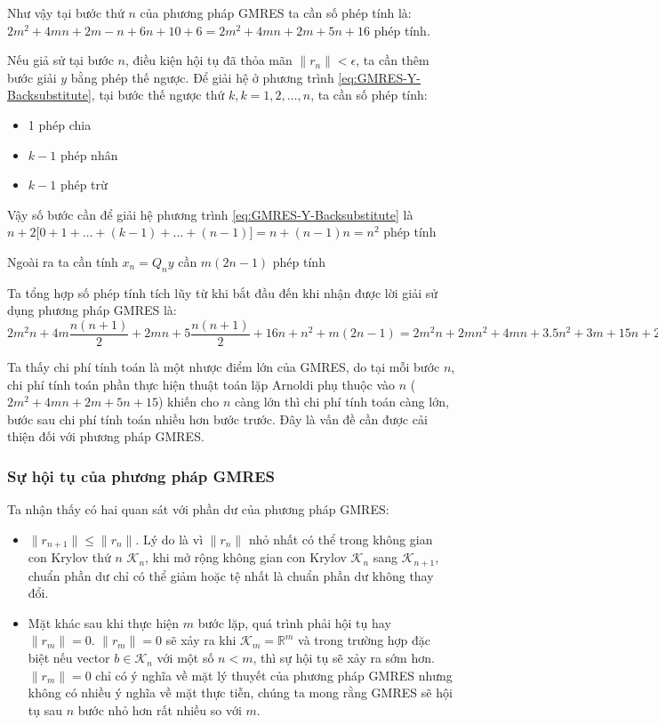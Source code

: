 \documentclass[14pt, a4paper]{article}
\numberwithin{equation}{section}
\numberwithin{algorithm}{section}
\numberwithin{figure}{section}
\numberwithin{dl}{section}
\numberwithin{md}{section}
\numberwithin{bd}{section}
\numberwithin{dn}{section}
\begin{document}
Như vậy tại bước thứ $n$ của phương pháp GMRES ta cần số phép tính là: $2m^2+4mn+2m-n + 6n+10 + 6=2m^2+4mn+2m+5n+16$ phép tính.

Nếu giả sử tại bước $n$, điều kiện hội tụ đã thỏa mãn $\lVert r_n \rVert < \epsilon$, ta cần thêm bước giải $y$ bằng phép thế ngược. Để giải hệ ở phương trình \ref{eq:GMRES-Y-Backsubstitute}, tại bước thế ngược thứ $k, k=1,2,\dots,n$, ta cần số phép tính:
\begin{itemize}
    \item 1 phép chia
    \item $k-1$ phép nhân
    \item $k-1$ phép trừ
\end{itemize}

Vậy số bước cần để giải hệ phương trình \ref{eq:GMRES-Y-Backsubstitute} là $n + 2\lbrack 0 + 1 + \dots + (k-1) + \dots + (n-1)\rbrack=n+(n-1)n=n^2$ phép tính

Ngoài ra ta cần tính $x_n = Q_n y$ cần $m(2n-1)$ phép tính

Ta tổng hợp số phép tính tích lũy từ khi bắt đầu đến khi nhận được lời giải sử dụng phương pháp GMRES là: $2m^2 n + 4m\dfrac{n(n+1)}{2}+2mn + 5\dfrac{n(n+1)}{2}+16n+n^2+m(2n-1)=2m^2 n + 2mn^2+4mn+3.5n^2+3m+15n+2.5 \sim \mathcal{O}(2m^2n+ 2mn^2)$

Ta thấy chi phí tính toán là một nhược điểm lớn của GMRES, do tại mỗi bước $n$, chi phí tính toán phần thực hiện thuật toán lặp Arnoldi phụ thuộc vào $n$ ($2m^2+4mn+2m+5n+15$) khiến cho $n$ càng lớn thì chi phí tính toán càng lớn, bước sau chi phí tính toán nhiều hơn bước trước. Đây là vấn đề cần được cải thiện đối với phương pháp GMRES.

\subsubsection{Sự hội tụ của phương pháp GMRES} \label{GMRES-Convergence}

Ta nhận thấy có hai quan sát với phần dư của phương pháp GMRES:

\begin{itemize}
    \item $ \lVert r_{n+1} \rVert \leq \lVert r_{n} \rVert $. Lý do là vì $\lVert r_n \rVert$ nhỏ nhất có thể trong không gian con Krylov thứ $n$ $\mathcal{K}_n$, khi mở rộng không gian con Krylov $\mathcal{K}_n$ sang $\mathcal{K}_{n+1}$, chuẩn phần dư chỉ có thể giảm hoặc tệ nhất là chuẩn phần dư không thay đổi.
    \item Mặt khác sau khi thực hiện $m$ bước lặp, quá trình phải hội tụ hay $\lVert r_m \rVert=0$. $\lVert r_m \rVert = 0$ sẽ xảy ra khi $\mathcal{K}_m = \mathbb{R}^m$ và trong trường hợp đặc biệt nếu vector $b \in \mathcal{K}_n$ với một số $n < m$, thì sự hội tụ sẽ xảy ra sớm hơn. $\lVert r_m \rVert = 0$ chỉ có ý nghĩa về mặt lý thuyết của phương pháp GMRES nhưng không có nhiều ý nghĩa về mặt thực tiễn, chúng ta mong rằng GMRES sẽ hội tụ sau $n$ bước nhỏ hơn rất nhiều so với $m$.
\end{itemize}
\end{document}
